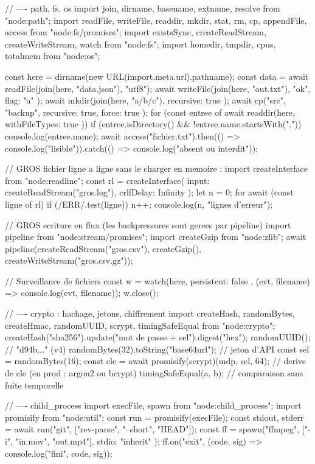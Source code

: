 \begin{codejs}
// ---- path, fs, os
import { join, dirname, basename, extname, resolve } from "node:path";
import { readFile, writeFile, readdir, mkdir, stat, rm, cp, appendFile, access } from "node:fs/promises";
import { existsSync, createReadStream, createWriteStream, watch } from "node:fs";
import { homedir, tmpdir, cpus, totalmem } from "node:os";

const here = dirname(new URL(import.meta.url).pathname);
const data = await readFile(join(here, "data.json"), "utf8");
await writeFile(join(here, "out.txt"), "ok\n", { flag: "a" });
await mkdir(join(here, "a/b/c"), { recursive: true });
await cp("src", "backup", { recursive: true, force: true });
for (const entree of await readdir(here, { withFileTypes: true })) {
  if (entree.isDirectory() && !entree.name.startsWith(".")) console.log(entree.name);
}
await access("fichier.txt").then(() => console.log("lisible")).catch(() => console.log("absent ou interdit"));

// GROS fichier ligne a ligne sans le charger en memoire :
import { createInterface } from "node:readline";
const rl = createInterface({ input: createReadStream("gros.log"), crlfDelay: Infinity });
let n = 0;
for await (const ligne of rl) if (/ERR/.test(ligne)) n++;
console.log(n, "lignes d'erreur");

// GROS ecriture en flux (les backpressures sont gerees par pipeline)
import { pipeline } from "node:stream/promises";
import { createGzip } from "node:zlib";
await pipeline(createReadStream("gros.csv"), createGzip(), createWriteStream("gros.csv.gz"));

// Surveillance de fichiers
const w = watch(here, { persistent: false }, (evt, filename) => console.log(evt, filename));
w.close();

// ---- crypto : hachage, jetons, chiffrement
import { createHash, randomBytes, createHmac, randomUUID, scrypt, timingSafeEqual } from "node:crypto";
createHash("sha256").update("mot de passe + sel").digest("hex");
randomUUID();                       // "d94b..." (v4)
randomBytes(32).toString("base64url");   // jeton d'API
const sel = randomBytes(16);
const cle = await promisify(scrypt)(mdp, sel, 64);   // derive de cle (en prod : argon2 ou bcrypt)
timingSafeEqual(a, b);              // comparaison sans fuite temporelle

// ---- child_process
import { execFile, spawn } from "node:child_process";
import { promisify } from "node:util";
const run = promisify(execFile);
const { stdout, stderr } = await run("git", ["rev-parse", "--short", "HEAD"]);
const ff = spawn("ffmpeg", ["-i", "in.mov", "out.mp4"], { stdio: "inherit" });
ff.on("exit", (code, sig) => console.log("fini", code, sig));


\end{codejs}
